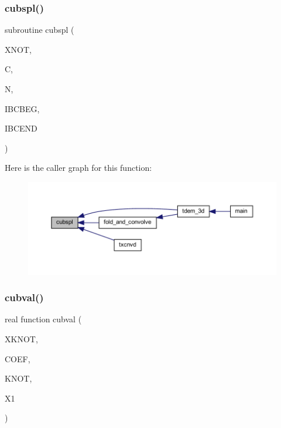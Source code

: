 \subsubsection{\texorpdfstring{cubspl()}{cubspl()}}
{\footnotesize\ttfamily subroutine cubspl (\begin{DoxyParamCaption}\item[{real, dimension(n), intent(in)}]{X\+N\+OT,  }\item[{real, dimension(4,n), intent(inout)}]{C,  }\item[{integer, intent(in)}]{N,  }\item[{integer, intent(in)}]{I\+B\+C\+B\+EG,  }\item[{integer, intent(in)}]{I\+B\+C\+E\+ND }\end{DoxyParamCaption})}

Here is the caller graph for this function\+:
\nopagebreak
\begin{figure}[H]
\begin{center}
\leavevmode
\includegraphics[width=350pt]{Marco_8f90_a108ddb07c94297e8965b149f8e8b0b10_icgraph}
\end{center}
\end{figure}
\mbox{\label{Marco_8f90_ab1863f6d59c2ac8a89880c1b6cc8cbe9}} 
\subsubsection{\texorpdfstring{cubval()}{cubval()}}
{\footnotesize\ttfamily real function cubval (\begin{DoxyParamCaption}\item[{real, dimension(knot), intent(in)}]{X\+K\+N\+OT,  }\item[{real, dimension(4,knot), intent(in)}]{C\+O\+EF,  }\item[{integer, intent(in)}]{K\+N\+OT,  }\item[{real, intent(in)}]{X1 }\end{DoxyParamCaption})}

